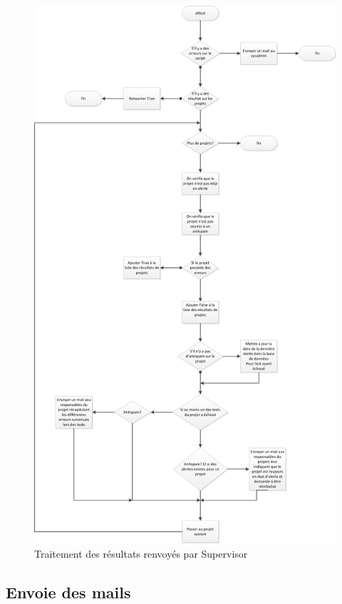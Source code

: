 \begin{figure}[h!]
	\centering
	\includegraphics[scale=0.5]{images/treatment.png}
	\caption{Traitement des résultats renvoyés par Supervisor}
\end{figure}

\subsection*{Envoie des mails}

